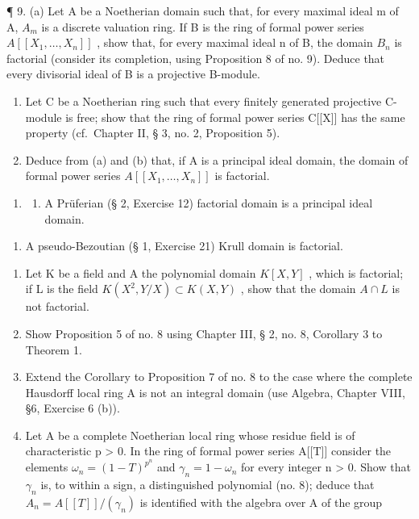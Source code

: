 ¶ 9. (a) Let A be a Noetherian domain such that, for every maximal ideal m of A, \(A_{m}\) is a discrete valuation ring. If B is the ring of formal power series \(A[[X_{1},\ldots,X_{n}]]\) , show that, for every maximal ideal n of B, the domain \(B_{n}\) is factorial (consider its completion, using Proposition 8 of no. 9). Deduce that every divisorial ideal of B is a projective B-module.

\begin{enumerate}
\def\labelenumi{(\alph{enumi})}
\setcounter{enumi}{1}
\item
  Let C be a Noetherian ring such that every finitely generated projective C-module is free; show that the ring of formal power series C{[}{[}X{]}{]} has the same property (cf.~Chapter II, § 3, no. 2, Proposition 5).
\item
  Deduce from (a) and (b) that, if A is a principal ideal domain, the domain of formal power series \(A[[X_{1},\ldots,X_{n}]]\) is factorial.
\end{enumerate}

\begin{enumerate}
\def\labelenumi{\arabic{enumi}.}
\setcounter{enumi}{9}
\tightlist
\item
  \begin{enumerate}
  \def\labelenumii{(\alph{enumii})}
  \tightlist
  \item
    A Prüferian (§ 2, Exercise 12) factorial domain is a principal ideal domain.
  \end{enumerate}
\end{enumerate}

\begin{enumerate}
\def\labelenumi{(\alph{enumi})}
\setcounter{enumi}{1}
\tightlist
\item
  A pseudo-Bezoutian (§ 1, Exercise 21) Krull domain is factorial.
\end{enumerate}

\begin{enumerate}
\def\labelenumi{\arabic{enumi}.}
\setcounter{enumi}{10}
\item
  Let K be a field and A the polynomial domain \(K[X,Y]\) , which is factorial; if L is the field \(K(X^{2},Y/X) \subset K(X,Y)\) , show that the domain \(A \cap L\) is not factorial.
\item
  Show Proposition 5 of no. 8 using Chapter III, § 2, no. 8, Corollary 3 to Theorem 1.
\item
  Extend the Corollary to Proposition 7 of no. 8 to the case where the complete Hausdorff local ring A is not an integral domain (use Algebra, Chapter VIII, §6, Exercise 6 (b)).
\item
  Let A be a complete Noetherian local ring whose residue field is of characteristic p \textgreater{} 0. In the ring of formal power series A{[}{[}T{]}{]} consider the elements \(\omega_{n} = (1 - T)^{p^{n}}\) and \(\gamma_{n} = 1 - \omega_{n}\) for every integer n \textgreater{} 0. Show that \(\gamma_{n}\) is, to within a sign, a distinguished polynomial (no. 8); deduce that \(A_{n} = A[[T]]/(\gamma_{n})\) is identified with the algebra over A of the group
\end{enumerate}

